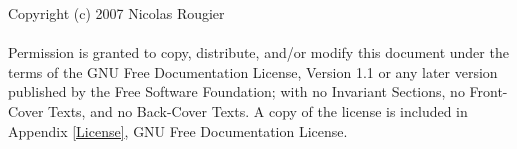 Copyright (c) 2007 Nicolas Rougier\\
\\

Permission is granted to copy, distribute, and/or modify this document under
the terms of the GNU Free Documentation License, Version 1.1 or any later
version published by the Free Software Foundation; with no Invariant Sections,
no Front-Cover Texts, and no Back-Cover Texts. A copy of the license is
included in Appendix \ref{License}, GNU Free Documentation License. 
